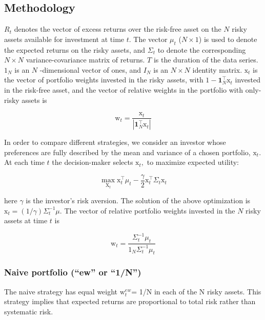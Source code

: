 \documentclass[11pt]{article}
\begin{document}
\subsection{Methodology}

$R_{t}$ denotes the vector of excess returns 
over the risk-free asset on the $N$ risky assets available for investment at time $t$. The vector $\mu_{t}$ ($N \times 1$) is used to denote the expected returns on the risky assets, and $\Sigma_{t}$ to denote the corresponding $N \times N$ variance-covariance matrix of returns. $T$ is the duration of the data series. $1_{N}$ is an $N$ -dimensional vector of ones, and $I_{N}$ is an $N \times N$ identity matrix. $\mathrm{x}_{t}$ is the vector of portfolio weights invested in the risky assets, with $1-\mathbf{1}_{N}^{\top} \mathrm{x}_{t}$ invested in the risk-free asset, and the vector of relative weights in the portfolio with only-risky assets is

\begin{equation} \label{eq:eq1}
\mathrm{w}_{t}=\frac{\mathrm{x}_{t}}{\left|\mathbf{1}_{N}^{\top} \mathrm{x}_{t}\right|}
\end{equation}

In order to compare different strategies, we consider an investor whose preferences are fully described by the mean and variance of a chosen portfolio, $\mathrm{x}_{t} .$ At each time $t$ the decision-maker selects $\mathrm{x}_{t},$ to maximize expected utility: 

\begin{equation} \label{eq:eq2}
\max _{\mathrm{X}_{t}} \mathrm{x}_{t}^{\top} \mu_{t}-\frac{\gamma}{2} \mathrm{x}_{t}^{\top} \Sigma_{t} \mathrm{x}_{t}
\end{equation}

here $\gamma$ is the investor's risk aversion. The solution of the above optimization is $\mathrm{x}_{t}=(1 / \gamma) \Sigma_{t}^{-1} \mu .$ The vector of relative portfolio weights invested in the $N$ risky
assets at time $t$ is

\begin{equation} \label{eq:eq3}
\mathrm{w}_{t}=\frac{\Sigma_{t}^{-1} \mu_{t}}{1_{N} \Sigma_{t}^{-1} \mu_{t}}
\end{equation}

\subsubsection{Naive portfolio (“ew” or “1/N”)}
The naive strategy has equal  weight $\mathrm{w}_{t}^{ew}$= 1/N in each
of the N risky assets. This strategy implies that expected returns are proportional to
total risk rather than systematic risk.
\end{document}
